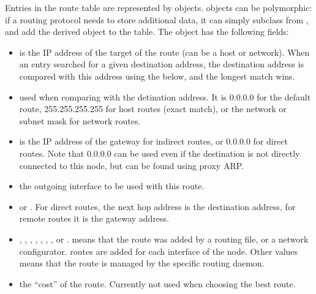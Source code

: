 Entries in the route table are represented by  objects.
 objects can be polymorphic: if a routing protocol needs
to store additional data, it can simply subclass from ,
and add the derived object to the table. The  object
has the following fields:
\begin{itemize}
  \item {} is the IP address of the target of the route (can be a host or network).
                   When an entry searched for a given destination address, the destination
                   address is compared with this  address using the 
                   below, and the longest match wins.
  \item {} used when comparing  with the detination address.
                     It is 0.0.0.0 for the default route, 255.255.255.255 for
                     host routes (exact match), or the network or subnet mask
                     for network routes.
  \item {} is the IP address of the gateway for indirect routes, or
                      0.0.0.0 for direct routes. Note that 0.0.0.0 can be used
                      even if the destination is not directly connected to this
                      node, but can be found using proxy ARP. 
  \item {} the outgoing interface to be used with this route.
  \item {}  or . For direct routes, the next hop
                   address is the destination address, for remote routes it is
                   the gateway address.
  \item {} , , , ,
        , , , or .  means
        that the route was added by a routing file, or a network configurator.
         routes are added for each interface of the node.
        Other values means that the route is managed by the specific routing
        daemon.
  \item {} the ``cost'' of the route. Currently not used when choosing
                     the best route.
\end{itemize}


